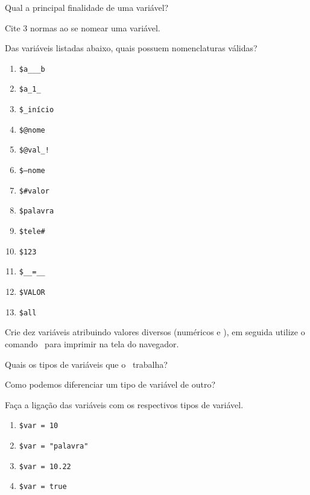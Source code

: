 \begin{description}[labelindent=30pt]
  \item [Q. 01] Qual a principal finalidade de uma variável?
  \item [Q. 02] Cite 3 normas ao se nomear uma variável.
  \item [Q. 03] Das variáveis listadas abaixo, quais possuem nomenclaturas válidas?
  \begin{multicols}{2}
    \begin{enumerate}
      \item \texttt{\$a\_\_\_b}
      \item \texttt{\$a\_1\_}
      \item \texttt{\$\_início}
      \item \texttt{\$@nome}
      \item \texttt{\$@val\_!}
      \item \texttt{\$--nome}
      \item \texttt{\$\#valor}
      \item \texttt{\$palavra}
      \item \texttt{\$tele\#}
      \item \texttt{\$123}
      \item \texttt{\$\_\_=\_\_}
      \item \texttt{\$VALOR}
      \item \texttt{\$all}
    \end{enumerate}
  \end{multicols}
  \item [Q. 04] Crie dez variáveis atribuindo valores diversos (numéricos e \tipostring), em
  seguida utilize o comando \funcaoecho~para imprimir na tela do navegador.
  
  \item [Q. 05] Quais os tipos de variáveis que o \php~trabalha?
  \item [Q. 06] Como podemos diferenciar um tipo de variável de outro?
  \item [Q. 07] Faça a ligação das variáveis com os respectivos tipos de variável.
  \begin{multicols}{2}
    \begin{enumerate}
      \item[] \texttt{\$var = 10}
      \item[] \texttt{\$var = "palavra"}
      \item[] \texttt{\$var = 10.22}
      \item[] \texttt{\$var = true}

\end{enumerate}
\end{multicols}
\end{description}
